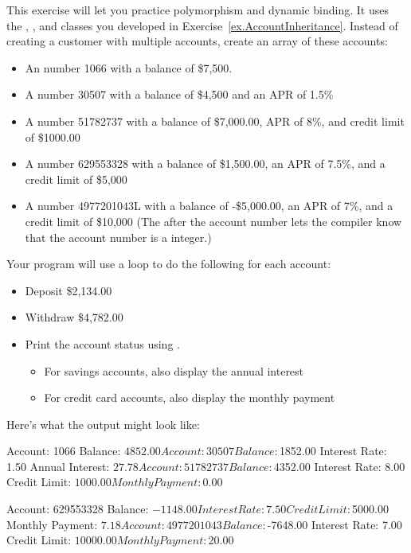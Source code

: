 \begin{exercise}
This exercise will let you practice polymorphism and dynamic binding. It uses the , , and  classes you developed in Exercise~\ref{ex.AccountInheritance}. Instead of creating a customer with multiple accounts, create an array of these accounts:

\begin{itemize}

\item An  number 1066 with a balance of \$7,500.
\item A  number 30507 with a balance of \$4,500 and an APR of 1.5\%
\item A  number 51782737 with a balance of \$7,000.00, APR of 8\%, and credit limit of \$1000.00
\item A  number 629553328 with a balance of \$1,500.00, an APR of 7.5\%, and a credit limit of \$5,000
\item A  number 4977201043L with a balance of -\$5,000.00, an APR of 7\%, and a credit limit of \$10,000 (The  after the account number lets the compiler know that the account number is a  integer.)
\end{itemize}

Your program will use a loop to do the following for each account:

\begin{itemize}
\item Deposit \$2,134.00
\item Withdraw \$4,782.00
\item Print the account status using .
    \begin{itemize}
        \item For savings accounts, also display the annual interest
        \item For credit card accounts, also display the monthly payment
    \end{itemize}
\end{itemize}

Here's what the output might look like:

\begin{stdout}
Account: 1066
Balance: $4852.00

Account: 30507
Balance: $1852.00
Interest Rate: 1.50%
Annual Interest: $27.78

Account: 51782737
Balance: $4352.00
Interest Rate: 8.00%
Credit Limit: $1000.00
Monthly Payment: $0.00

Account: 629553328
Balance: $-1148.00
Interest Rate: 7.50%
Credit Limit: $5000.00
Monthly Payment: $7.18

Account: 4977201043
Balance: $-7648.00
Interest Rate: 7.00%
Credit Limit: $10000.00
Monthly Payment: $20.00
\end{stdout}

\end{exercise}
